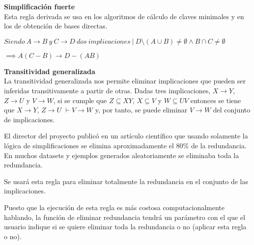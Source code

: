 % 
\textbf{Simplificaci\'on fuerte}\\

Esta regla derivada se usa en los algoritmos de c\'alculo de claves minimales y en los de obtenci\'on de bases directas. 
\begin{center}
    \(Siendo \ A \to B \ y \ C\to D \ dos \ implicaciones \ | \ D \setminus (A \cup B) \neq \emptyset \wedge B \cap C \neq \emptyset\)
\end{center}

\begin{center}
    \(\implies A(C-B) \to D - (AB)\)
\end{center}


\bigskip

\textbf{Transitividad generalizada}\\

La transitividad generalizada nos permite eliminar implicaciones que pueden ser inferidas transitivamente a partir de otras. Dadas tres implicaciones, \(X \to Y\), \(Z \to U\) y \(V \to W\), si se cumple que \(Z \subseteq XY \), \( X \subseteq V \) y \( W \subseteq UV \) entonces se tiene que  \(X \to Y\), \(Z \to U\) \( \vdash V \to W\) y, por tanto, se puede eliminar \(V \to W\) del conjunto de implicaciones.

El director del proyecto public\'o en un art\'iculo cient\'ifico que usando solamente la l\'ogica de simplificaciones se elimina aproximadamente el 80\% de la redundancia. En muchos datasets y ejemplos generados aleatoriamente se eliminaba toda la redundancia. 

Se usar\'a esta regla para eliminar totalmente la redundancia en el conjunto de las implicaciones. 

Puesto que la ejecuci\'on de esta regla es m\'as costosa computacionalmente hablando, la funci\'on de eliminar redundancia tendr\'a un parámetro con el que el usuario indique si se quiere eliminar toda la redundancia o no (aplicar esta regla o no).\\

\newpage

\newpage
